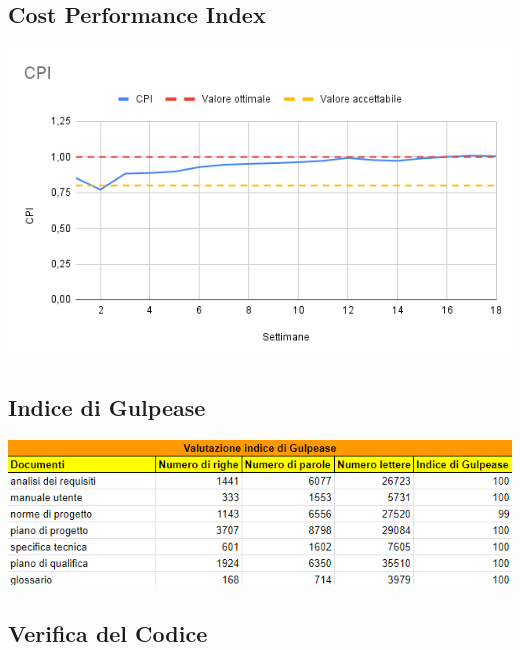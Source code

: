 \documentclass[12pt]{article}
\begin{document}
\subsection{Cost Performance Index}
\begin{center}
	\includegraphics[scale=0.6]{CPI.png}
\end{center}
\subsection{Indice di Gulpease}
\begin{center}
	\includegraphics[scale=0.8]{Gulpease.png}
\end{center}


\subsection{Verifica del Codice}
\end{document}
